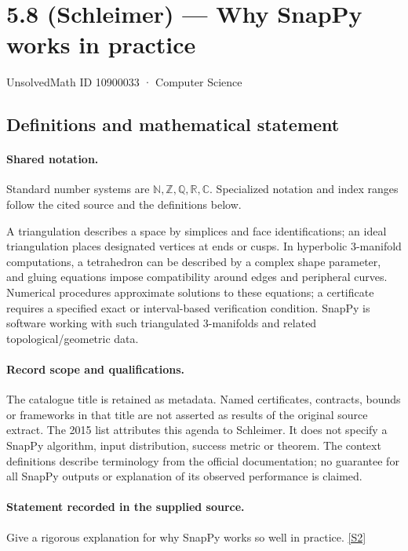 \documentclass[11pt]{article}
\newcommand{\sref}[2]{\hyperlink{source:#1:#2}{[S#2]}}
\begin{document}
\setcounter{section}{10900032}
\section{5.8 (Schleimer) — Why SnapPy works in practice}\label{10900033}
{\small\sffamily UnsolvedMath ID 10900033 · Computer Science}
\subsection{Definitions and mathematical statement}

\paragraph{Shared notation.}Standard number systems are $\mathbb N,\mathbb Z,\mathbb Q,\mathbb R,\mathbb C$. Specialized notation and index ranges follow the cited source and the definitions below.


A triangulation describes a space by simplices and face identifications; an ideal triangulation places designated vertices at ends or cusps. In hyperbolic $3$-manifold computations, a tetrahedron can be described by a complex shape parameter, and gluing equations impose compatibility around edges and peripheral curves. Numerical procedures approximate solutions to these equations; a certificate requires a specified exact or interval-based verification condition. SnapPy is software working with such triangulated $3$-manifolds and related topological/geometric data.
\paragraph{Record scope and qualifications.}
The catalogue title is retained as metadata. Named certificates, contracts, bounds or frameworks in that title are not asserted as results of the original source extract.
The 2015 list attributes this agenda to Schleimer. It does not specify a SnapPy algorithm, input distribution, success metric or theorem. The context definitions describe terminology from the official documentation; no guarantee for all SnapPy outputs or explanation of its observed performance is claimed.
\paragraph{Statement recorded in the supplied source.}
Give a rigorous explanation for why SnapPy works so well in practice. \sref{10900033}{2}
\end{document}
